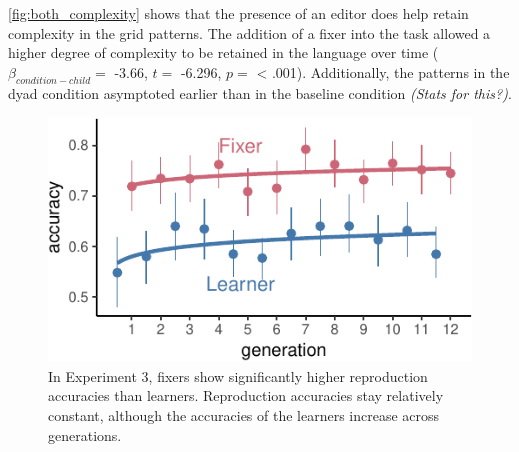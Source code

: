 \documentclass[10pt, letterpaper]{article}
\newenvironment{CodeChunk}{}{}
\begin{document}
\ref{fig:both_complexity} shows that the presence of an editor does help
retain complexity in the grid patterns. The addition of a fixer into the
task allowed a higher degree of complexity to be retained in the
language over time (\(\beta_{condition-child} =\) -3.66, \(t =\) -6.296,
\(p =\) \textless{} .001). Additionally, the patterns in the dyad
condition asymptoted earlier than in the baseline condition \emph{(Stats
for this?)}.

\begin{CodeChunk}
\begin{figure}[tb]

{\centering \includegraphics{figs/dyad_accuracy-1} 

}

\caption[In Experiment 3, fixers show significantly higher reproduction accuracies than learners]{In Experiment 3, fixers show significantly higher reproduction accuracies than learners. Reproduction accuracies stay relatively constant, although the accuracies of the learners increase across generations.}\label{fig:dyad_accuracy}
\end{figure}
\end{CodeChunk}
\end{document}
